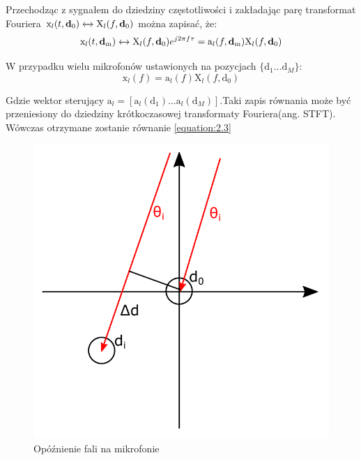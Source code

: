 \noindent Przechodząc z sygnałem do dziedziny częstotliwości i zakładając parę transformat Fouriera $\mathrm{x}_{l}(t,\bm{\mathrm{d}}_{0})\xleftrightarrow{}\mathrm{X}_{l}(f,\bm{\mathrm{d}}_{0})$ można zapisać, że:
\begin{equation}
    \label{equation:2.6}
    \mathrm{x}_{l}(t,\bm{\mathrm{d}}_{\mathrm{m}}) \xleftrightarrow{} \mathrm{X}_{l}(f,\bm{\mathrm{d}}_{0})e^{j 2 \pi f \tau} =
    \mathrm{a}_{l}(f,\bm{\mathrm{d}}_{\mathrm{m}}) \mathrm{X}_{l}(f,\bm{\mathrm{d}}_{0}) 
\end{equation}

\noindent W przypadku wielu mikrofonów ustawionych na pozycjach $\{\bm{\mathrm{d}}_{1}...\bm{\mathrm{d}}_{M} \}$:
\begin{equation}
    \label{equation:2.7}
    \bm{\mathrm{x}}_l(f)=
    \bm{\mathrm{a}}_l(f)\mathrm{X}_{l}(f,\bm{\mathrm{d}}_{0})
\end{equation}

\noindent Gdzie wektor sterujący $\bm{\mathrm{a}}_{l} = [\mathrm{a}_{l}(\bm{\mathrm{d}}_{1})...\mathrm{a}_{l}(\bm{\mathrm{d}}_{M})]$.Taki zapis równania może być przeniesiony do dziedziny krótkoczasowej transformaty Fouriera(ang. STFT). Wówczas otrzymane zostanie równanie \ref{equation:2.3}

\begin{figure}[h]
    \centering
    \includegraphics[width=\textwidth]{Images/direction.png}
    \caption{Opóźnienie fali na mikrofonie}
    \label{fig:direction}
\end{figure}

